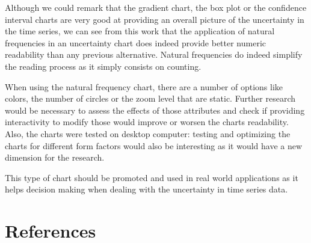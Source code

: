 \documentclass[a4paper,3p,sort&compress]{elsarticle}
\begin{document}
Although we could remark that the gradient chart, the box plot or the confidence interval charts are very good at 
providing an overall picture of the uncertainty in the time series, we can see from this work that the application of natural 
frequencies in an uncertainty chart does indeed
provide better numeric readability than any previous alternative. Natural frequencies do indeed simplify 
the reading process as it simply consists on counting.

When using the natural frequency chart, there are a number of options like colors, the number of circles or the 
zoom level that are static. Further research would be necessary to assess the effects of those 
attributes and check if providing interactivity to modify those would improve or worsen the charts readability. 
Also, the charts were tested on desktop computer: testing and optimizing the charts for different form factors
would also be interesting as it would have a new dimension for the research.

This type of chart should be promoted and used in real world applications as it helps decision making when 
dealing with the uncertainty in time series data. 

\section{References}
\label{sec:ref}



\end{document}

